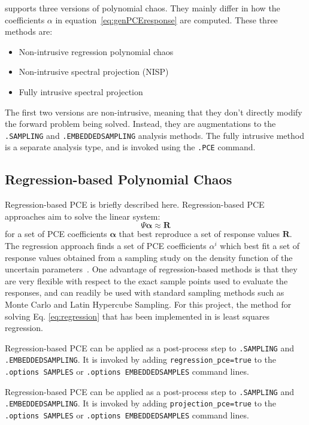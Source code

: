 \Xyce{} supports three versions of polynomial chaos.  They mainly differ in how the coefficients $\alpha$ in equation~\ref{eq:genPCEresponse} are computed.  These three methods are:
\begin{itemize}
  \item Non-intrusive regression polynomial chaos
  \item Non-intrusive spectral projection  (NISP)
  \item Fully intrusive spectral projection
\end{itemize}
The first two versions are non-intrusive, meaning that they don't directly modify the forward problem being solved.  
Instead, they are augmentations to the \texttt{.SAMPLING} and \texttt{.EMBEDDEDSAMPLING} analysis methods.
The fully intrusive method is a separate analysis type, and is invoked using the \texttt{.PCE} command.

\subsection{Regression-based Polynomial Chaos}
\label{regressionPCE}

Regression-based PCE is briefly described here.
Regression-based PCE approaches aim to solve the linear system:
\begin{equation}
\boldsymbol{\varPsi} \boldsymbol{\alpha} \approx \boldsymbol{R} \label{eq:regression}
\end{equation}
for a set of PCE coefficients $\boldsymbol{\alpha}$ that best
reproduce a set of response values $\boldsymbol{R}$.  
The regression approach finds a set of PCE coefficients $\alpha^i$ which best fit a set of response
values obtained from a sampling study on the density function of the uncertain 
parameters~\cite{pt_colloc1}.  One advantage of regression-based methods is that
they are very flexible with respect to the exact sample points used to evaluate the responses, 
and can readily be used with standard sampling methods such as Monte Carlo and Latin Hypercube Sampling.
For this project, the method for solving 
Eq. \eqref{eq:regression} that has been implemented in \Xyce{} is 
least squares regression.

Regression-based PCE can be applied as a post-process step 
to \texttt{.SAMPLING} and \texttt{.EMBEDDEDSAMPLING}.  It is invoked by adding 
\texttt{regression\_pce=true} to the \texttt{.options SAMPLES} 
or \texttt{.options EMBEDDEDSAMPLES} command lines.


Regression-based PCE can be applied as a post-process step 
to \texttt{.SAMPLING} and \texttt{.EMBEDDEDSAMPLING}.  It is invoked by adding 
\texttt{projection\_pce=true} to the \texttt{.options SAMPLES} 
or \texttt{.options EMBEDDEDSAMPLES} command lines.  

